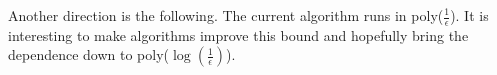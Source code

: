 \documentclass[BTech]{iitmdiss}
\begin{document}
		 Another direction is the following. The current algorithm runs in poly($\frac{1}{\epsilon}$). It is interesting to make algorithms 
		 improve this bound and hopefully bring the dependence down to poly($\log (\frac{1}{\epsilon})$).
		
\pagebreak
\begin{singlespace}
  \begin{small}
	
  \end{small}
\end{singlespace}

\end{document}
